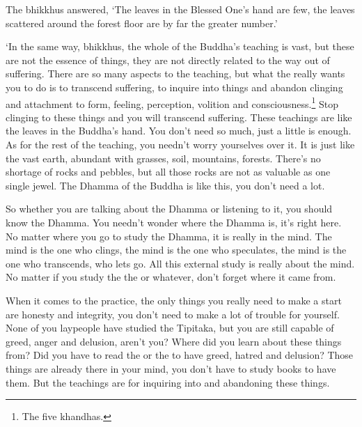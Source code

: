 The bhikkhus answered, `The leaves in the Blessed One's hand are few, the leaves scattered around the forest floor are by far the greater number.'

`In the same way, bhikkhus, the whole of the Buddha's teaching is vast, but these are not the essence of things, they are not directly related to the way out of suffering. There are so many aspects to the teaching, but what the  really wants you to do is to transcend suffering, to inquire into things and abandon clinging and attachment to form, feeling, perception, volition and consciousness.\footnote{The five khandhas.} Stop clinging to these things and you will transcend suffering. These teachings are like the leaves in the Buddha's hand. You don't need so much, just a little is enough. As for the rest of the teaching, you needn't worry yourselves over it. It is just like the vast earth, abundant with grasses, soil, mountains, forests. There's no shortage of rocks and pebbles, but all those rocks are not as valuable as one single jewel. The Dhamma of the Buddha is like this, you don't need a lot.

So whether you are talking about the Dhamma or listening to it, you should know the Dhamma. You needn't wonder where the Dhamma is, it's right here. No matter where you go to study the Dhamma, it is really in the mind. The mind is the one who clings, the mind is the one who speculates, the mind is the one who transcends, who lets go. All this external study is really about the mind. No matter if you study the  the  or whatever, don't forget where it came from.

When it comes to the practice, the only things you really need to make a start are honesty and integrity, you don't need to make a lot of trouble for yourself. None of you laypeople have studied the Tipi\.taka, but you are still capable of greed, anger and delusion, aren't you? Where did you learn about these things from? Did you have to read the  or the  to have greed, hatred and delusion? Those things are already there in your mind, you don't have to study books to have them. But the teachings are for inquiring into and abandoning these things.

